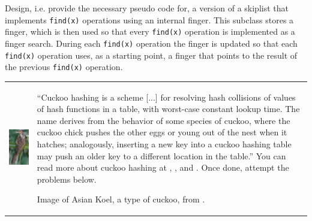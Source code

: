 \documentclass[addpoints]{exam}
\begin{document}
\begin{questions}
  Design, i.e. provide the necessary pseudo code for, a version of a skiplist that implements \texttt{find(x)} operations using an internal finger. This subclass stores a finger, which is then used so that every \texttt{find(x)} operation is implemented as a finger search. During each \texttt{find(x)} operation the finger is updated so that each \texttt{find(x)} operation uses, as a starting point, a finger that points to the result of the previous \texttt{find(x)} operation.
  \begin{solution}
  \end{solution}

  \begin{tabularx}{1.0\linewidth}{lX}
  \includegraphics[width=.15\textwidth,align=t]{koel}
    &
      ``Cuckoo hashing is a scheme [...] for resolving hash collisions of values of hash functions in a table, with worst-case constant lookup time. The name derives from the behavior of some species of cuckoo, where the cuckoo chick pushes the other eggs or young out of the nest when it hatches; analogously, inserting a new key into a cuckoo hashing table may push an older key to a different location in the table.'' \cite{wp_cuckoohash} You can read more about cuckoo hashing at \cite{cuckoo_stanford}, \cite{cuckoo_geeks}, and \cite{cuckoo_guide}. Once done, attempt the problems below.
      \vspace{30pt}
      
      Image of Asian Koel, a type of cuckoo, from \cite{wp_koel}.
  \end{tabularx}
\end{questions}
\end{document}

